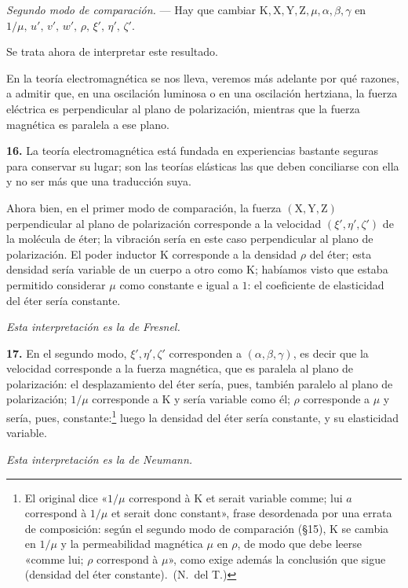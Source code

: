 \emph{Segundo modo de comparación.} — Hay que cambiar
$\mathrm{K},\mathrm{X},\mathrm{Y},\mathrm{Z},\mu,\alpha,\beta,\gamma$ en
$1/\mu,\,u',\,v',\,w',\,\rho,\,\xi',\,\eta',\,\zeta'$.

Se trata ahora de interpretar este resultado.

En la teoría electromagnética se nos lleva, veremos más adelante por qué
razones, a admitir que, en una oscilación luminosa o en una oscilación
hertziana, la fuerza eléctrica es perpendicular al plano de polarización,
mientras que la fuerza magnética es paralela a ese plano.

\noindent\textbf{16.} La teoría electromagnética está fundada en
experiencias bastante seguras para conservar su lugar; son las teorías
elásticas las que deben conciliarse con ella y no ser más que una
traducción suya.

Ahora bien, en el primer modo de comparación, la fuerza
$(\mathrm{X},\mathrm{Y},\mathrm{Z})$ perpendicular al plano de polarización
corresponde a la velocidad $(\xi',\eta',\zeta')$ de la molécula de éter;
la vibración sería en este caso perpendicular al plano de polarización. El
poder inductor $\mathrm{K}$ corresponde a la densidad $\rho$ del éter; esta
densidad sería variable de un cuerpo a otro como $\mathrm{K}$; habíamos
visto que estaba permitido considerar $\mu$ como constante e igual a $1$:
el coeficiente de elasticidad del éter sería constante.

\emph{Esta interpretación es la de Fresnel.}

\noindent\textbf{17.} En el segundo modo, $\xi',\eta',\zeta'$ corresponden
a $(\alpha,\beta,\gamma)$, es decir que la velocidad corresponde a la
fuerza magnética, que es paralela al plano de polarización: el
desplazamiento del éter sería, pues, también paralelo al plano de
polarización; $1/\mu$ corresponde a $\mathrm{K}$ y sería variable como
él; $\rho$ corresponde a $\mu$ y sería, pues, constante:\footnote{El
original dice «$1/\mu$ correspond à K et serait variable comme; lui $a$
correspond à $1/\mu$ et serait donc constant», frase desordenada por una
errata de composición: según el segundo modo de comparación (§15),
$\mathrm{K}$ se cambia en $1/\mu$ y la permeabilidad magnética $\mu$ en
$\rho$, de modo que debe leerse «comme lui; $\rho$ correspond à $\mu$»,
como exige además la conclusión que sigue (densidad del éter
constante).~(N.~del T.)} luego la densidad del éter sería constante, y su
elasticidad variable.

\emph{Esta interpretación es la de Neumann.}

